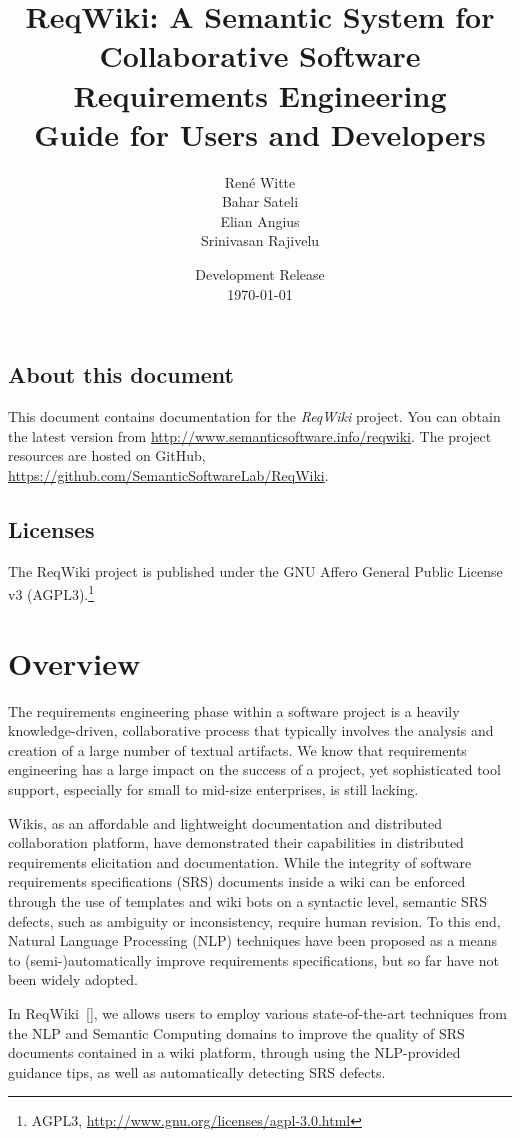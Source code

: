 \documentclass[10pt,twoside,openany,bibtotoc,liststotoc]{scrbook}
\title{ReqWiki: A Semantic System for
Collaborative Software Requirements Engineering\bigskip\\
\Large Guide for Users and Developers}
\author{Ren\'{e} Witte\\
Bahar Sateli\\
Elian Angius\\
Srinivasan Rajivelu
\medskip}
\date{Development Release\\
\today
}
\newcommand{\blankline}{\vspace{5mm}}
\begin{document}
\frontmatter
\maketitle

\tableofcontents

\section*{About this document}
This document contains documentation for the \emph{ReqWiki} project. You can obtain the latest version from
\url{http://www.semanticsoftware.info/reqwiki}. The project resources are hosted on GitHub,
\url{https://github.com/SemanticSoftwareLab/ReqWiki}. 

\section*{Licenses}
The ReqWiki project is
published under the GNU Affero General Public License v3
(AGPL3).\footnote{AGPL3,
\url{http://www.gnu.org/licenses/agpl-3.0.html}}

\mainmatter
\chapter{Overview}
The requirements engineering phase within a software project is a heavily knowledge-driven, collaborative process that typically involves the analysis and creation of a large number of textual artifacts. We know that requirements engineering has a large impact on the success of a project, yet sophisticated tool support, especially for small to mid-size enterprises, is still lacking. 

\blankline
Wikis, as an affordable and lightweight documentation and distributed collaboration platform, have demonstrated their capabilities in distributed requirements elicitation and documentation. While the integrity of software requirements specifications (SRS) documents inside a wiki can be enforced through the use of templates and wiki bots on a syntactic level, semantic SRS defects, such as ambiguity or inconsistency, require human revision. To this end, Natural Language Processing (NLP) techniques have been proposed as a means to (semi-)automatically improve requirements specifications, but so far have not been widely adopted. 

\blankline
In ReqWiki~[\cite{reqwiki2012}], we allows users to employ various state-of-the-art techniques from the NLP and Semantic Computing domains to improve the quality of SRS documents contained in a wiki platform, through using the NLP-provided guidance tips, as well as automatically detecting SRS defects.
\end{document}
